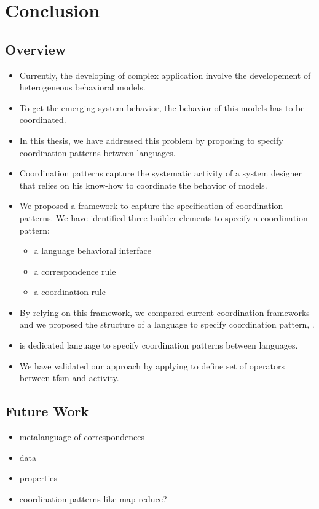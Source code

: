 \chapter{Conclusion}
\label{ch:conclusions}

\section{Overview}

\begin{itemize}
	
	\item Currently, the developing of complex application involve the developement of heterogeneous behavioral models. 
	
	\item To get the emerging system behavior, the behavior of this models has to be coordinated. 
	
	\item In this thesis, we have addressed this problem by proposing to specify coordination patterns between languages. 
	
	\item Coordination patterns capture the systematic activity of a system designer that relies on his know-how to coordinate the behavior of models.


	\item We proposed a framework to capture the specification of coordination patterns. We have identified three builder elements to specify a coordination pattern:
		\begin{itemize}
			\item a language behavioral interface
			\item a correspondence rule
			\item a coordination rule
		\end{itemize}
	\item By relying on this framework, we compared current coordination frameworks and we proposed the structure of a language to specify coordination pattern, \bcool. 
	  	
	\item \bcool is dedicated language to specify coordination patterns between languages.
	  	
	
	\item We have validated our approach by applying \bcool to define set of operators between tfsm and activity.  

	
\end{itemize}
\section{Future Work}
\begin{itemize}
	\item metalanguage of correspondences
	\item data
	\item properties 
	\item coordination patterns like map reduce? 
\end{itemize}
